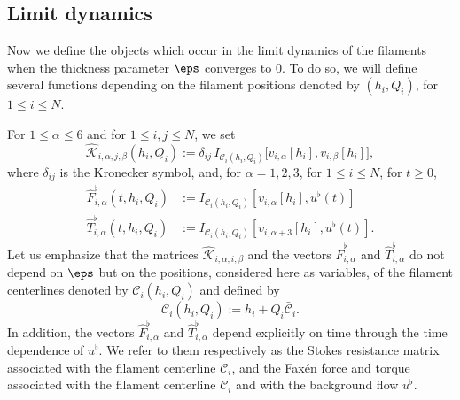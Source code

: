 \subsection{Limit dynamics}
\label{sec-mr-lim}

Now {we define} the objects which occur in the limit dynamics of the filaments when the thickness parameter $\eps$ converges to $0$. To do so, we will define several functions depending on the filament positions denoted by $(h_i,Q_i)$, for $1 \leq i \leq N$.

For $1 \leqslant \alpha \leqslant 6 $ and for $1 \leq i,j \leq N$, we set
\begin{equation} \label{hatK}
\hat{\mathcal K}_{i,\alpha,j,\beta} ({h_i,Q_i}) :=
\delta_{ij} \,
I_{\mathcal{C}_i (h_i,Q_i)} \big[v_{i,\alpha}[h_i], v_{i,\beta}[h_i]\big],
\end{equation}
where $\delta_{ij}$ is the Kronecker symbol, and,
for $ \alpha =1,2,3 $, for $1 \leq i \leq N$, for $t\geq 0$,
\begin{equation}
\label{hatfab}
\begin{aligned}
\hat{F}^\flat_{i,\alpha} ({t,h_i,Q_i}) &:=
I_{\mathcal{C}_i (h_i,Q_i)} [v_{i,\alpha}[h_i],
u^\flat(t)]
\\
\hat{T}^\flat_{i,\alpha} ({t,h_i,Q_i}) &:=
I_{\mathcal{C}_i (h_i,Q_i)} [v_{i,\alpha+3}[h_i],
u^\flat (t)].
\end{aligned}
\end{equation}
Let us emphasize that the matrices
$ \hat{\mathcal K}_{i,\alpha,i,\beta} $ and the vectors $\hat{F}^\flat_{i,\alpha} $ and $\hat{T}^\flat_{i,\alpha}$ do not depend on $\eps$ but on the positions, considered here as variables, of the filament centerlines denoted by $\mathcal{C}_i (h_i,Q_i)$ and defined by
\begin{equation*}
\mathcal{C}_i (h_i,Q_i) := h_i + Q_i \bar {\mathcal C}_i.
\end{equation*}
In addition, the vectors $\hat{F}^\flat_{i,\alpha} $ and $\hat{T}^\flat_{i,\alpha}$ depend explicitly on time through the time dependence of $u^\flat$.
We refer to them respectively as the
Stokes resistance matrix asso\-ciated with the filament centerline $\mathcal{C}_i $, and
the Faxén force and torque asso\-ciated with the filament centerline $\mathcal{C}_i$ and with
the background flow $u^\flat$.

